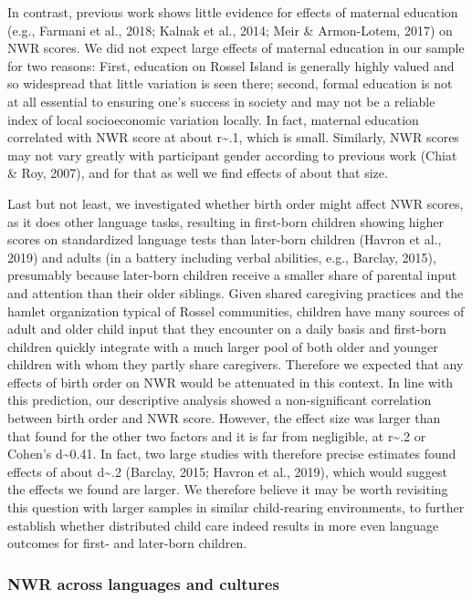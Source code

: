 \documentclass[english,,man,floatsintext]{apa6}
\begin{document}
In contrast, previous work shows little evidence for effects of maternal education (e.g., Farmani et al., 2018; Kalnak et al., 2014; Meir \& Armon-Lotem, 2017) on NWR scores. We did not expect large effects of maternal education in our sample for two reasons: First, education on Rossel Island is generally highly valued and so widespread that little variation is seen there; second, formal education is not at all essential to ensuring one's success in society and may not be a reliable index of local socioeconomic variation locally. In fact, maternal education correlated with NWR score at about r\textasciitilde{}.1, which is small. Similarly, NWR scores may not vary greatly with participant gender according to previous work (Chiat \& Roy, 2007), and for that as well we find effects of about that size.

Last but not least, we investigated whether birth order might affect NWR scores, as it does other language tasks, resulting in first-born children showing higher scores on standardized language tests than later-born children (Havron et al., 2019) and adults (in a battery including verbal abilities, e.g., Barclay, 2015), presumably because later-born children receive a smaller share of parental input and attention than their older siblings. Given shared caregiving practices and the hamlet organization typical of Rossel communities, children have many sources of adult and older child input that they encounter on a daily basis and first-born children quickly integrate with a much larger pool of both older and younger children with whom they partly share caregivers. Therefore we expected that any effects of birth order on NWR would be attenuated in this context. In line with this prediction, our descriptive analysis showed a non-significant correlation between birth order and NWR score. However, the effect size was larger than that found for the other two factors and it is far from negligible, at r\textasciitilde{}.2 or Cohen's d\textasciitilde{}0.41. In fact, two large studies with therefore precise estimates found effects of about d\textasciitilde{}.2 (Barclay, 2015; Havron et al., 2019), which would suggest the effects we found are larger. We therefore believe it may be worth revisiting this question with larger samples in similar child-rearing environments, to further establish whether distributed child care indeed results in more even language outcomes for first- and later-born children.

\hypertarget{nwr-across-languages-and-cultures}{%
\subsubsection{NWR across languages and cultures}\label{nwr-across-languages-and-cultures}}
\end{document}
